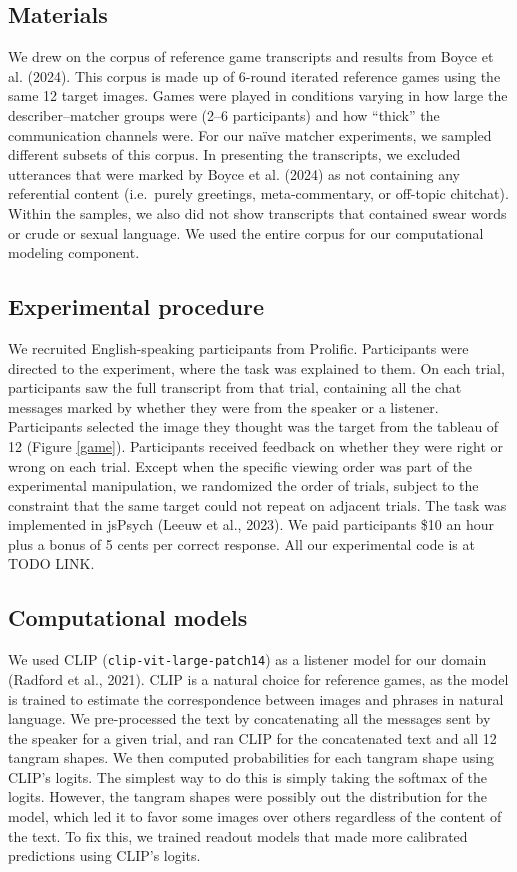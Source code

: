 \documentclass[10pt, letterpaper]{article}
\begin{document}
\subsection{Materials}\label{materials}

We drew on the corpus of reference game transcripts and results from
Boyce et al. (2024). This corpus is made up of 6-round iterated
reference games using the same 12 target images. Games were played in
conditions varying in how large the describer--matcher groups were (2--6
participants) and how ``thick'' the communication channels were. For our
naïve matcher experiments, we sampled different subsets of this corpus.
In presenting the transcripts, we excluded utterances that were marked
by Boyce et al. (2024) as not containing any referential content
(i.e.~purely greetings, meta-commentary, or off-topic chitchat). Within
the samples, we also did not show transcripts that contained swear words
or crude or sexual language. We used the entire corpus for our
computational modeling component.

\subsection{Experimental procedure}\label{experimental-procedure}

We recruited English-speaking participants from Prolific. Participants
were directed to the experiment, where the task was explained to them.
On each trial, participants saw the full transcript from that trial,
containing all the chat messages marked by whether they were from the
speaker or a listener. Participants selected the image they thought was
the target from the tableau of 12 (Figure \ref{game}). Participants
received feedback on whether they were right or wrong on each trial.
Except when the specific viewing order was part of the experimental
manipulation, we randomized the order of trials, subject to the
constraint that the same target could not repeat on adjacent trials. The
task was implemented in jsPsych (Leeuw et al., 2023). We paid
participants \$10 an hour plus a bonus of 5 cents per correct response.
All our experimental code is at TODO LINK.

\subsection{Computational models}\label{computational-models}

We used CLIP (\texttt{clip-vit-large-patch14}) as a listener model for
our domain (Radford et al., 2021). CLIP is a natural choice for
reference games, as the model is trained to estimate the correspondence
between images and phrases in natural language. We pre-processed the
text by concatenating all the messages sent by the speaker for a given
trial, and ran CLIP for the concatenated text and all 12 tangram shapes.
We then computed probabilities for each tangram shape using CLIP's
logits. The simplest way to do this is simply taking the softmax of the
logits. However, the tangram shapes were possibly out the distribution
for the model, which led it to favor some images over others regardless
of the content of the text. To fix this, we trained readout models that
made more calibrated predictions using CLIP's logits.
\end{document}
